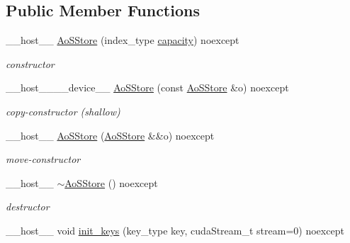 \subsection*{Public Member Functions}
\begin{DoxyCompactItemize}
\item 
\+\_\+\+\_\+host\+\_\+\+\_\+ \hyperlink{classwarpcore_1_1storage_1_1key__value_1_1AoSStore_af99150a303902380688e35c914f01431}{Ao\+S\+Store} (index\+\_\+type \hyperlink{classwarpcore_1_1storage_1_1key__value_1_1AoSStore_a23c4cb728f870dfa09a0d0d976cedf8e}{capacity}) noexcept
\begin{DoxyCompactList}\small\item\em constructor \end{DoxyCompactList}\item 
\+\_\+\+\_\+host\+\_\+\+\_\+\+\_\+\+\_\+device\+\_\+\+\_\+ \hyperlink{classwarpcore_1_1storage_1_1key__value_1_1AoSStore_a55dc641ec2d9643973506f6ed0c4b817}{Ao\+S\+Store} (const \hyperlink{classwarpcore_1_1storage_1_1key__value_1_1AoSStore}{Ao\+S\+Store} \&o) noexcept
\begin{DoxyCompactList}\small\item\em copy-\/constructor (shallow) \end{DoxyCompactList}\item 
\+\_\+\+\_\+host\+\_\+\+\_\+ \hyperlink{classwarpcore_1_1storage_1_1key__value_1_1AoSStore_ae3eef233b7fd2dbfeedd90c72c119d29}{Ao\+S\+Store} (\hyperlink{classwarpcore_1_1storage_1_1key__value_1_1AoSStore}{Ao\+S\+Store} \&\&o) noexcept
\begin{DoxyCompactList}\small\item\em move-\/constructor \end{DoxyCompactList}\item 
\mbox{\label{classwarpcore_1_1storage_1_1key__value_1_1AoSStore_a0007916878191e222fd831f379eac189}} 
\+\_\+\+\_\+host\+\_\+\+\_\+ \hyperlink{classwarpcore_1_1storage_1_1key__value_1_1AoSStore_a0007916878191e222fd831f379eac189}{$\sim$\+Ao\+S\+Store} () noexcept
\begin{DoxyCompactList}\small\item\em destructor \end{DoxyCompactList}\item 
\+\_\+\+\_\+host\+\_\+\+\_\+ void \hyperlink{classwarpcore_1_1storage_1_1key__value_1_1AoSStore_ad425f8f6a239c074c240ca1228fb4e06}{init\+\_\+keys} (key\+\_\+type key, cuda\+Stream\+\_\+t stream=0) noexcept

\end{DoxyCompactItemize}
